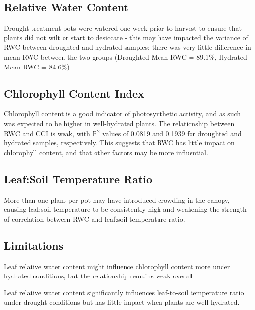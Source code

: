 \documentclass{report}
\begin{document}
\subsection{Relative Water Content}

Drought treatment pots were watered one week prior to harvest to ensure that plants did not wilt or start to desiccate - this may have impacted the variance of RWC between droughted and hydrated samples: there was very little difference in mean RWC between the two groups (Droughted Mean RWC = 89.1\%, Hydrated Mean RWC = 84.6\%).

\subsection{Chlorophyll Content Index}

Chlorophyll content is a good indicator of photosynthetic activity, and as such was expected to be higher in well-hydrated plants. The relationship between RWC and CCI is weak, with R${}^{2}$ values of 0.0819 and 0.1939 for droughted and hydrated samples, respectively. This suggests that RWC has little impact on chlorophyll content, and that other factors may be more influential.

\subsection{Leaf:Soil Temperature Ratio}

More than one plant per pot may have introduced crowding in the canopy, causing leaf:soil temperature to be consistently high and weakening the strength of correlation between RWC and leaf:soil temperature ratio.


\subsection{Limitations}

Leaf relative water content might influence chlorophyll content more under hydrated conditions, but the relationship remains weak overall

Leaf relative water content significantly influences leaf-to-soil temperature ratio under drought conditions but has little impact when plants are well-hydrated.

\clearpage

\printbibliography
\end{document}
